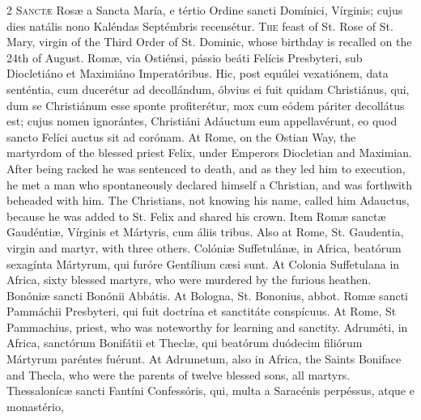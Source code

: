 \begin{paracol}{2}
\lettrine[lines=2]{S}{anctæ} Rosæ a Sancta María, e tértio Ordine sancti Domínici, Vírginis; cujus dies natális nono 
 Kaléndas Septémbris recensétur.
\switchcolumn
{}
\lettrine[lines=2]{T}{he} feast of St. Rose of St. Mary, 
 virgin of the Third Order of St. Dominic, whose birthday is recalled on the 
 24th of August.
\switchcolumn*
{}
Romæ, via Ostiénsi, 
 pássio beáti Felícis Presbyteri, sub Diocletiáno et Maximiáno Imperatóribus. 
 Hic, post equúlei vexatiónem, data senténtia, cum ducerétur ad decollándum, 
 óbvius ei fuit quidam Christiánus, qui, dum se Christiánum esse sponte 
 profiterétur, mox cum eódem páriter decollátus est; cujus nomen ignorántes, 
 Christiáni Adáuctum eum appellavérunt, eo quod sancto Felíci auctus sit ad 
 corónam.
\switchcolumn
{}
At Rome, on the Ostian Way, the 
 martyrdom of the blessed priest Felix, under Emperors Diocletian and 
 Maximian. After being racked he was sentenced to death, and as they 
 led him to execution, he met a man who spontaneously declared himself a 
 Christian, and was forthwith beheaded with him. The Christians, not 
 knowing his name, called him Adauctus, because he was added to St. Felix and 
 shared his crown.
\switchcolumn*
{}
Item Romæ sanctæ 
 Gaudéntiæ, Vírginis et Mártyris, cum áliis tribus.
\switchcolumn
{}
Also at Rome, St. Gaudentia, virgin 
 and martyr, with three others.
\switchcolumn*
{}
Colóniæ Suffetulánæ, in 
 Africa, beatórum sexagínta Mártyrum, qui furóre Gentílium cæsi sunt.
\switchcolumn
{}
At Colonia Suffetulana in Africa, 
 sixty blessed martyrs, who were murdered by the furious heathen.
\switchcolumn*
{}
Bonóniæ sancti Bonónii 
 Abbátis.
\switchcolumn
{}
At Bologna, St. Bononius, abbot.
\switchcolumn*
{}
Romæ sancti Pammáchii 
 Presbyteri, qui fuit doctrína et sanctitáte conspícuus.
\switchcolumn
{}
At Rome, St Pammachius, priest, who 
 was noteworthy for learning and sanctity.
\switchcolumn*
{}
Adruméti, in Africa, 
 sanctórum Bonifátii et Theclæ, qui beatórum duódecim filiórum Mártyrum 
 paréntes fuérunt.
\switchcolumn
{}
At Adrumetum, also in Africa, the 
 Saints Boniface and Thecla, who were the parents of twelve blessed sons, all 
 martyrs.
\switchcolumn*
{}
Thessalonícæ sancti 
 Fantíni Confessóris, qui, multa a Saracénis perpéssus, atque e monastério, 

\end{paracol}

